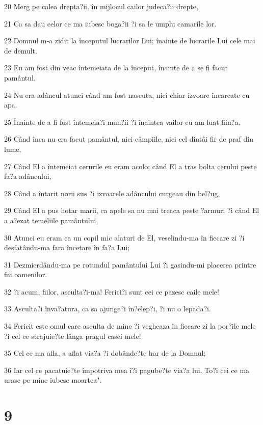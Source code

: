\par 20 Merg pe calea drepta?ii, în mijlocul cailor judeca?ii drepte,
\par 21 Ca sa dau celor ce ma iubesc boga?ii ?i sa le umplu camarile lor.
\par 22 Domnul m-a zidit la începutul lucrarilor Lui; înainte de lucrarile Lui cele mai de demult.
\par 23 Eu am fost din veac întemeiata de la început, înainte de a se fi facut pamântul.
\par 24 Nu era adâncul atunci când am fost nascuta, nici chiar izvoare încarcate cu apa.
\par 25 Înainte de a fi fost întemeia?i mun?ii ?i înaintea vailor eu am luat fiin?a.
\par 26 Când înca nu era facut pamântul, nici câmpiile, nici cel dintâi fir de praf din lume,
\par 27 Când El a întemeiat cerurile eu eram acolo; când El a tras bolta cerului peste fa?a adâncului,
\par 28 Când a întarit norii sus ?i izvoarele adâncului curgeau din bel?ug,
\par 29 Când El a pus hotar marii, ca apele sa nu mai treaca peste ?armuri ?i când El a a?ezat temeliile pamântului,
\par 30 Atunci eu eram ca un copil mic alaturi de El, veselindu-ma în fiecare zi ?i desfatându-ma fara încetare în fa?a Lui;
\par 31 Dezmierdându-ma pe rotundul pamântului Lui ?i gasindu-mi placerea printre fiii oamenilor.
\par 32 ?i acum, fiilor, asculta?i-ma! Ferici?i sunt cei ce pazesc caile mele!
\par 33 Asculta?i înva?atura, ca sa ajunge?i în?elep?i, ?i nu o lepada?i.
\par 34 Fericit este omul care asculta de mine ?i vegheaza în fiecare zi la por?ile mele ?i cel ce strajuie?te lânga pragul casei mele!
\par 35 Cel ce ma afla, a aflat via?a ?i dobânde?te har de la Domnul;
\par 36 Iar cel ce pacatuie?te împotriva mea î?i pagube?te via?a lui. To?i cei ce ma urasc pe mine iubesc moartea".

\chapter{9}

